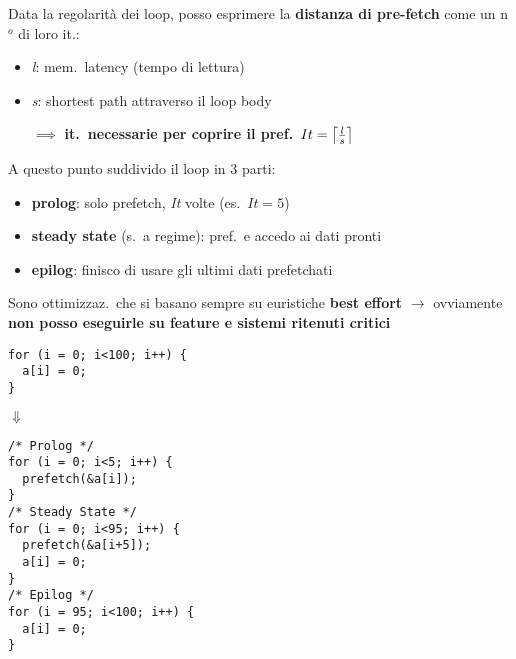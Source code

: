 \begin{minipage}[c]{.55\textwidth}
Data la regolarit\`a dei loop, posso esprimere la \textbf{distanza di pre-fetch} come un n$^{o}$ di loro it.:

\begin{example}[frametitle={}]
    \begin{itemize}
      \item \textit{l}: mem.~latency (tempo di lettura)
      \item \textit{s}: shortest path attraverso il loop body
      \item [$\implies$] \textbf{it.~necessarie per coprire il pref.}~$It = \left\lceil {l\over s} \right\rceil$
    \end{itemize}
\end{example}

A questo punto suddivido il loop in 3 parti: 
\begin{itemize}
  \item \textbf{prolog}: solo prefetch, \textit{It} volte (es.~$It=5$)
  \item \textbf{steady state} (s.~a regime): pref.~e accedo ai dati pronti
  \item \textbf{epilog}: finisco di usare gli ultimi dati prefetchati
\end{itemize}

\begin{emphasize}
  Sono ottimizzaz.~che si basano sempre su euristiche \textbf{best effort} $\rightarrow$ ovviamente \textbf{non posso eseguirle su feature e sistemi ritenuti critici}
\end{emphasize}
\end{minipage}
\hfill
\begin{minipage}[c]{.35\textwidth}
  \centering
\begin{lstlisting}
for (i = 0; i<100; i++) {
  a[i] = 0;
}\end{lstlisting}
$\Downarrow$
\begin{lstlisting}
/* Prolog */
for (i = 0; i<5; i++) {
  prefetch(&a[i]);
}
/* Steady State */
for (i = 0; i<95; i++) {
  prefetch(&a[i+5]);
  a[i] = 0;
}
/* Epilog */
for (i = 95; i<100; i++) {
  a[i] = 0;
}\end{lstlisting}
\end{minipage}


